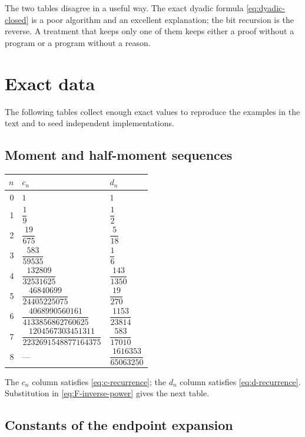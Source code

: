 \documentclass[11pt,oneside]{article}
\theoremstyle{definition}
\theoremstyle{remark}
\begin{document}
The two tables disagree in a useful way.  The exact dyadic formula \eqref{eq:dyadic-closed}
is a poor algorithm and an excellent explanation; the bit recursion is the reverse.  A
treatment that keeps only one of them keeps either a proof without a program or a program
without a reason.

\appendix

\section{Exact data}
\label{app:data}

The following tables collect enough exact values to reproduce the examples in the text and
to seed independent implementations.

\subsection{Moment and half-moment sequences}

\begin{longtable}{@{}rll@{}}
\toprule
$n$ & $c_n$ & $d_n$\\
\midrule
\endhead
0 & $1$ & $1$\\[0.3ex]
1 & $\dfrac1{9}$ & $\dfrac1{2}$\\[0.8ex]
2 & $\dfrac{19}{675}$ & $\dfrac5{18}$\\[0.8ex]
3 & $\dfrac{583}{59535}$ & $\dfrac1{6}$\\[0.8ex]
4 & $\dfrac{132809}{32531625}$ & $\dfrac{143}{1350}$\\[0.8ex]
5 & $\dfrac{46840699}{24405225075}$ & $\dfrac{19}{270}$\\[0.8ex]
6 & $\dfrac{4068990560161}{4133856862760625}$ &
    $\dfrac{1153}{23814}$\\[0.8ex]
7 & $\dfrac{1204567303451311}{2232691548877164375}$ &
    $\dfrac{583}{17010}$\\[0.8ex]
8 & --- & $\dfrac{1616353}{65063250}$\\
\bottomrule
\end{longtable}

The $c_n$ column satisfies \eqref{eq:c-recurrence}; the $d_n$ column satisfies
\eqref{eq:d-recurrence}.  Substitution in \eqref{eq:F-inverse-power} gives the next table.

\subsection{Constants of the endpoint expansion}
\end{document}
